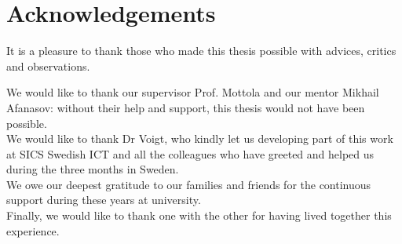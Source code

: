 \chapter*{Acknowledgements}


\noindent
It is a pleasure to thank those who made this thesis possible with advices, critics and observations.

\noindent
We would like to thank our supervisor Prof. Mottola and our mentor Mikhail Afanasov: without their help and support, this thesis would not have been possible.\\

\noindent
We would like to thank Dr Voigt, who kindly let us developing part of this work at SICS Swedish ICT and all the colleagues who have greeted and helped us during the three months in Sweden.\\

\noindent
We owe our deepest gratitude to our families and friends for the continuous support during these years at university.\\

\noindent
Finally, we would like to thank one with the other for having lived together this experience.\\